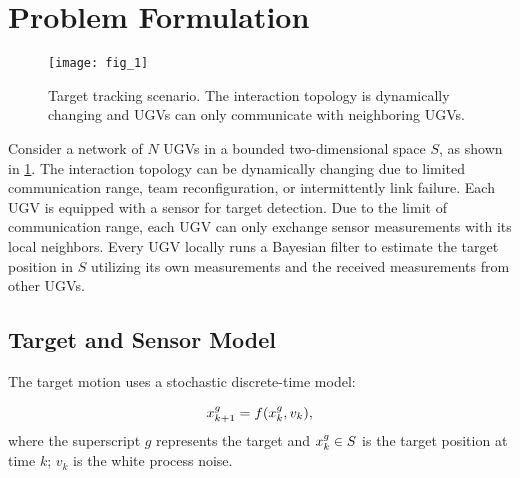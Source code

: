\section{Problem Formulation}\label{sec:prob}
\begin{figure}%
	\centering
	\texttt{[image: fig\_1]}
	\caption{Target tracking scenario. The interaction topology is dynamically changing and UGVs can only communicate with neighboring UGVs.}
	\label{fig:scenario}
\end{figure}
	Consider a network of $N$ UGVs in a bounded two-dimensional space $S$, as shown in \cref{fig:scenario}.
	The interaction topology can be dynamically changing due to limited communication range, team reconfiguration, or intermittently link failure.
	Each UGV is equipped with a sensor for target detection. 
	Due to the limit of communication range, each UGV can only exchange sensor measurements with its local neighbors. 
	Every UGV locally runs a Bayesian filter to estimate the target position in $S$ utilizing its own measurements and the received measurements from other UGVs. 
	
	\subsection{Target and Sensor Model}
	The target motion uses a stochastic discrete-time model: %
	
	\begin{equation}
		\small
		\label{eqn:tar_motion_model}
		\xg_{k+1}=f(\xg_k,v_k), %
	\end{equation}\normalsize
	where the superscript $g$ represents the target and $x^g_k\in S$ is the target position at time $k$;
	$v_k$ is the white process noise.
	
